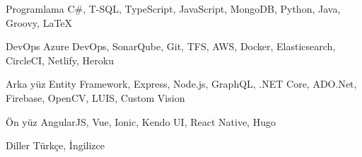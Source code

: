 
\begin{cvskills}

  \cvskill
    {Programlama} %
    {C\#, T-SQL, TypeScript, JavaScript, MongoDB, Python, Java, Groovy, \LaTeX} %

  \cvskill
    {DevOps} %
    {Azure DevOps, SonarQube, Git, TFS, AWS, Docker, Elasticsearch, CircleCI, Netlify, Heroku} %

  \cvskill
    {Arka yüz} %
    {Entity Framework, Express, Node.js, GraphQL, .NET Core, ADO.Net, Firebase, OpenCV, LUIS, Custom Vision} %

  \cvskill
    {Ön yüz} %
    {AngularJS, Vue, Ionic, Kendo UI, React Native, Hugo} %

  \cvskill
    {Diller} %
    {Türkçe, İngilizce} %

\end{cvskills}
